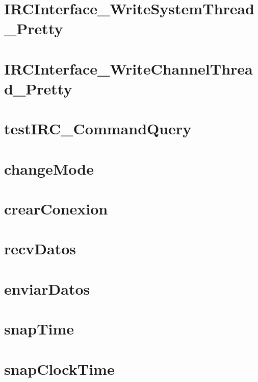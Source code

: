 \documentclass[twoside]{book}
\begin{document}
\chapter{I\-R\-C\-Interface\-\_\-\-Write\-System\-Thread\-\_\-\-Pretty}
\label{_i_r_c_interface__write_system_thread__pretty}
\hypertarget{_i_r_c_interface__write_system_thread__pretty}{}

\chapter{I\-R\-C\-Interface\-\_\-\-Write\-Channel\-Thread\-\_\-\-Pretty}
\label{_i_r_c_interface__write_channel_thread__pretty}
\hypertarget{_i_r_c_interface__write_channel_thread__pretty}{}

\chapter{test\-I\-R\-C\-\_\-\-Command\-Query}
\label{test_i_r_c__command_query}
\hypertarget{test_i_r_c__command_query}{}

\chapter{change\-Mode}
\label{change_mode}
\hypertarget{change_mode}{}

\chapter{crear\-Conexion}
\label{crear_conexion}
\hypertarget{crear_conexion}{}

\chapter{recv\-Datos}
\label{recv_datos}
\hypertarget{recv_datos}{}

\chapter{enviar\-Datos}
\label{enviar_datos}
\hypertarget{enviar_datos}{}

\chapter{snap\-Time}
\label{snap_time}
\hypertarget{snap_time}{}

\chapter{snap\-Clock\-Time}
\label{snap_clock_time}
\hypertarget{snap_clock_time}{}

\end{document}
